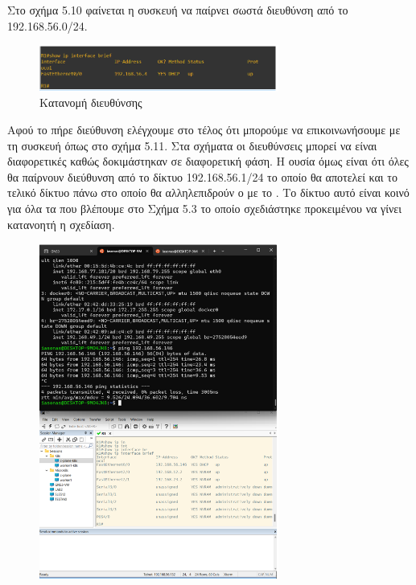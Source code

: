 Στο σχήμα 5.10 φαίνεται η συσκευή να παίρνει σωστά  διευθύνση από το 192.168.56.0/24.

\FloatBarrier

\begin{figure}[htb]
	\centering
	\includegraphics[width=0.7\textwidth]{graphics/cisco_ip_address.png}
	\caption{Κατανομή  διευθύνσης}
\end{figure}

\FloatBarrier


Αφού το  πήρε  διεύθυνση ελέγχουμε στο τέλος ότι μπορούμε να επικοινωνήσουμε με τη συσκευή όπως στο σχήμα 5.11. Στα σχήματα οι  διευθύνσεις μπορεί να είναι διαφορετικές καθώς δοκιμάστηκαν σε διαφορετική φάση. Η ουσία όμως είναι ότι όλες θα παίρνουν  διεύθυνση από το δίκτυο 192.168.56.1/24 το οποίο θα αποτελεί και το τελικό δίκτυο πάνω στο οποίο θα αλληλεπιδρούν ο  με το . Το δίκτυο αυτό είναι κοινό για όλα τα  που βλέπουμε στο Σχήμα 5.3 το οποίο σχεδιάστηκε προκειμένου να γίνει κατανοητή η σχεδίαση.

\FloatBarrier

\begin{figure}[htb]
	\centering
	\includegraphics[width=0.7\textwidth]{graphics/ip_connectivity_test.png}
	\caption{}
\end{figure}

